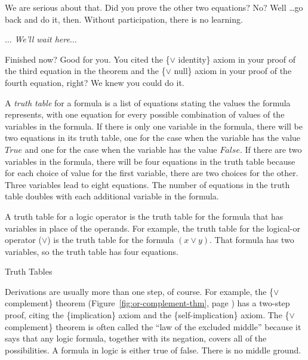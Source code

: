 We are serious about that. Did you prove the other two equations?
No? Well \dots go back and do it, then. Without participation, there
is no learning.

\smallskip
$\dots$ \emph{We'll wait here}$\dots$
\smallskip

Finished now? Good for you. You cited the \{$\vee$ identity\} axiom in your
proof of the third equation in the theorem and the \{$\vee$ null\}
axiom in your proof of the fourth equation, right? We knew you could do it.

\begin{aside}
A \emph{truth table} for a formula is a list of equations
stating the values the formula represents,
with one equation for every possible combination of values
of the variables in the formula.
If there is only one variable in the formula,
there will be two equations in its truth table,
one for the case when the variable has the value
$True$ and one for the case when the variable has the value $False$.
If there are two variables in the formula,
there will be four equations in the truth table
because for each choice of value for the first variable,
there are two choices for the other.
Three variables lead to eight equations.
The number of equations in the truth table
doubles with each additional variable
in the formula.

A truth table for a logic operator is the truth table for the formula
that has variables in place of the operands.
For example, the truth table for the logical-or operator ($\vee$)
is the truth table for the formula $(x \vee y)$.
That formula has two variables, so the truth table has four equations.
\caption{Truth Tables}
\label{truth-tables}
\end{aside}

Derivations are usually more than one step, of course.
For example, the
\{$\vee$ complement\} theorem
(Figure~\ref{fig:or-complement-thm}, page \pageref{fig:or-complement-thm})
has a two-step proof, citing the \{implication\} axiom
and the \{self-implication\} axiom.
The \{$\vee$ complement\} theorem is often called the
``law of the excluded middle'' because it says that any
logic formula, together with its negation, covers all
of the possibilities.
A formula in logic is either true of false.
There is no middle ground.

